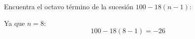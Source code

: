 Encuentra el octavo término de la sucesión $100-18(n-1)$:

\begin{solutionbox}{1.6cm}
    Ya que $n=8$:
    \[100-18(8-1)=-26\]
\end{solutionbox}